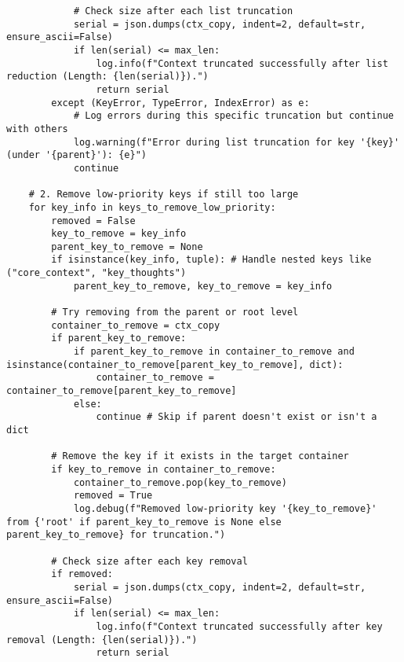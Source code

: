 \documentclass[12pt,a4paper]{article}
\begin{document}
\begin{pageablecode}
\begin{verbatim}
            # Check size after each list truncation
            serial = json.dumps(ctx_copy, indent=2, default=str, ensure_ascii=False)
            if len(serial) <= max_len:
                log.info(f"Context truncated successfully after list reduction (Length: {len(serial)}).")
                return serial
        except (KeyError, TypeError, IndexError) as e:
            # Log errors during this specific truncation but continue with others
            log.warning(f"Error during list truncation for key '{key}' (under '{parent}'): {e}")
            continue

    # 2. Remove low-priority keys if still too large
    for key_info in keys_to_remove_low_priority:
        removed = False
        key_to_remove = key_info
        parent_key_to_remove = None
        if isinstance(key_info, tuple): # Handle nested keys like ("core_context", "key_thoughts")
            parent_key_to_remove, key_to_remove = key_info

        # Try removing from the parent or root level
        container_to_remove = ctx_copy
        if parent_key_to_remove:
            if parent_key_to_remove in container_to_remove and isinstance(container_to_remove[parent_key_to_remove], dict):
                container_to_remove = container_to_remove[parent_key_to_remove]
            else:
                continue # Skip if parent doesn't exist or isn't a dict

        # Remove the key if it exists in the target container
        if key_to_remove in container_to_remove:
            container_to_remove.pop(key_to_remove)
            removed = True
            log.debug(f"Removed low-priority key '{key_to_remove}' from {'root' if parent_key_to_remove is None else parent_key_to_remove} for truncation.")

        # Check size after each key removal
        if removed:
            serial = json.dumps(ctx_copy, indent=2, default=str, ensure_ascii=False)
            if len(serial) <= max_len:
                log.info(f"Context truncated successfully after key removal (Length: {len(serial)}).")
                return serial


\end{verbatim}
\end{pageablecode}
\end{document}
